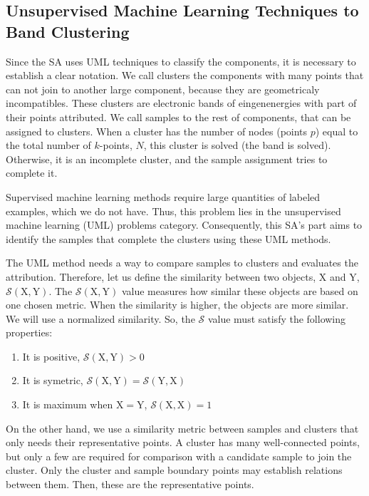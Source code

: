 \documentclass[a4paper,12pt]{report}
\begin{document}
\begin{appendices}
\subsection{Unsupervised Machine Learning Techniques to Band Clustering}

Since the SA uses UML techniques to classify the components, it is necessary to establish a clear notation.
We call clusters the components with many points that can not join to another large component, because they are geometricaly incompatibles.
These clusters are electronic bands of eingenenergies with part of their points attributed.
We call samples to the rest of components, that can be assigned to clusters.
When a cluster has the number of nodes (points $p$) equal to the total number of $k$-points, $N$, this cluster is solved (the band is solved). Otherwise, it is an incomplete cluster, and the sample assignment tries to complete it.

Supervised machine learning methods require large quantities of labeled examples, which we do not have. Thus, this problem lies in the unsupervised machine learning (UML) problems category. Consequently, this SA's part aims to identify the samples that complete the clusters using these UML methods.

The UML method needs a way to compare samples to clusters and evaluates the attribution. Therefore, let us define the similarity between two objects, $\mathrm{X}$ and $\mathrm{Y}$, $\mathcal{S}(\mathrm{X}, \mathrm{Y})$. The $\mathcal{S}(\mathrm{X}, \mathrm{Y})$ value measures how similar these objects are based on one chosen metric. When the similarity is higher, the objects are more similar. We will use a normalized similarity.
So, the $\mathcal{S}$ value must satisfy the following properties:

\begin{enumerate}
    \item It is positive, $\mathcal{S}(\mathrm{X}, \mathrm{Y}) > 0$
    \item It is symetric, $\mathcal{S}(\mathrm{X}, \mathrm{Y}) = \mathcal{S}(\mathrm{Y}, \mathrm{X})$
    \item It is maximum when $\mathrm{X}=\mathrm{Y}$, $\mathcal{S}(\mathrm{X}, \mathrm{X})=1$
\end{enumerate}

On the other hand, we use a similarity metric between samples and clusters that only needs their representative points. A cluster has many well-connected points, but only a few are required for comparison with a candidate sample to join the cluster. Only the cluster and sample boundary points may establish relations between them. Then, these are the representative points.


\end{appendices}
\end{document}

